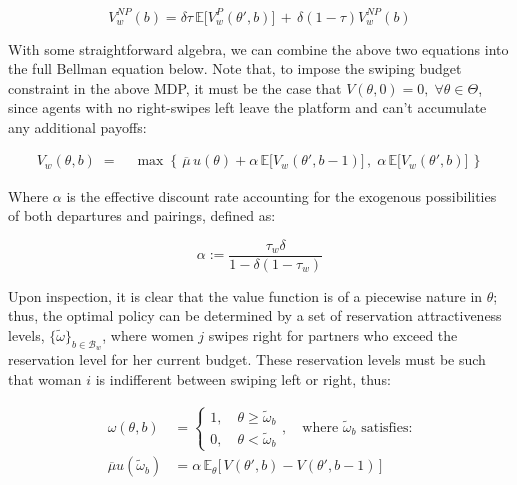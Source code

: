 \begin{equation} 
        V^{NP}_w(b) = \delta \tau \,\mathbb{E}\Big[ V^P_w(\theta', b)\Big] \,+\, \delta (1-\tau) V^{NP}_w(b) 
\end{equation}

With some straightforward algebra, we can combine the above two equations into the full Bellman equation below. Note that, to impose the swiping budget constraint in the above MDP, it must be the case that $V(\theta, 0)=0, \; \forall \theta \in \Theta$, since agents with no right-swipes left leave the platform and can't accumulate any additional payoffs:

\begin{equation}
    \begin{aligned} 
        V_w(\theta,b) \;=\;&\max\left\{\,\overline{\mu} \, u(\theta) +\alpha \,\mathbb{E}\Big[V_w(\theta', b-1)\Big]\,,\; \alpha\,\mathbb{E}\Big[ V_w(\theta', b)\Big]\,\right\}
    \end{aligned}
\end{equation}

Where $\alpha$ is the effective discount rate accounting for the exogenous possibilities of both departures and pairings, defined as: 

\begin{equation*}
\alpha:=\frac{\tau_w\delta}{1-\delta(1-\tau_w)}
\end{equation*}

Upon inspection, it is clear that the value function is of a piecewise nature in $\theta$; thus, the optimal policy can be determined by a set of reservation attractiveness levels, $\{\tilde\omega\}_{b\in \mathcal{B}_w}$, where women $j$ swipes right for partners who exceed the reservation level for her current budget. These reservation levels must be such that woman $i$ is indifferent between swiping left or right, thus:

\begin{equation*}
    \begin{split}
        \omega(\theta,b)&=\begin{cases}
            1,\quad \theta\geq \widetilde{\omega}_b \\ 
            0, \quad\theta< \widetilde\omega _b  
        \end{cases} , \quad \text{where $\widetilde{\omega}_b$ satisfies:} \\[10pt] 
        \overline\mu u(\widetilde\omega_b) &= \alpha \, \mathbb{E}_\theta\Big[\,V(\theta',b)-V(\theta',b-1)\,\Big]  
    \end{split}
\end{equation*} 

